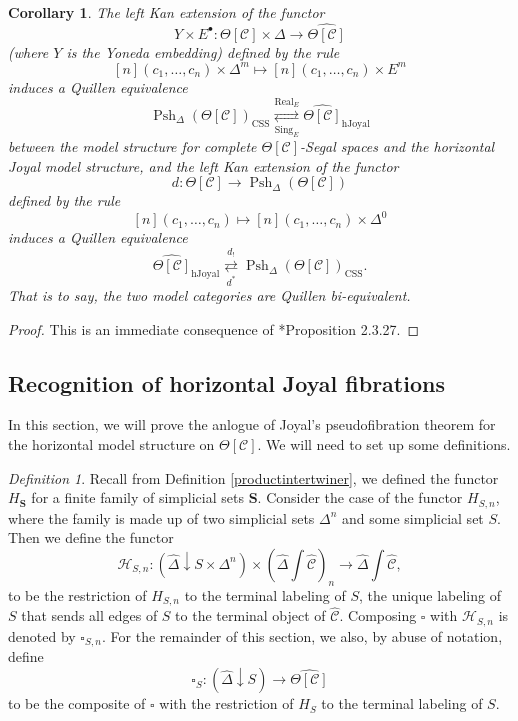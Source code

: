 \documentclass[leqno]{article}
\numberwithin{equation}{subsection}
\theoremstyle{plain}   %
\newtheorem{cor}[equation]{Corollary}
\theoremstyle{remark}
\newtheorem{defn}[equation]{Definition}
\theoremstyle{plain}
\DeclareMathOperator{\Psh}{Psh}
\newcommand{\overcat}[2]{{\left(#1\downarrow #2\right)}}
\newcommand{\psh}[1]{\ensuremath{\widehat{#1}}}
\renewcommand{\C}{\ensuremath{\mathcal{C}}}
\newcommand{\cellset}{\ensuremath{\widehat{\Theta[\mathcal{C}]}}}
\newcommand{\ssetlab}{\ensuremath{\widehat{\Delta} \int \widehat{\mathcal{C}}}}
\begin{document}
\begin{cor}
	The left Kan extension of the functor \[Y \times E^\bullet:\Theta[\C]\times \Delta \to \cellset\] (where \(Y\) is the Yoneda embedding) defined by the rule 
	\[[n](c_1,\dots,c_n)\times \Delta^m \mapsto [n](c_1,\dots,c_n) \times E^m\]
	induces a Quillen equivalence
	\[\Psh_\Delta(\Theta[\C])_{\mathrm{CSS}} \underset{\operatorname{Sing}_E}{\overset{\operatorname{Real}_E}{\rightleftarrows}} \cellset_{\mathrm{hJoyal}}\]
	between the model structure for complete \(\Theta[\C]\)-Segal spaces and the horizontal Joyal model structure,
	and the left Kan extension of the functor 
	\[d:\Theta[\C] \to \Psh_\Delta(\Theta[\C])\]
	defined by the rule
	\[[n](c_1,\dots,c_n) \mapsto [n](c_1,\dots,c_n) \times \Delta^0\]
	induces a Quillen equivalence
	\[\cellset_{\mathrm{hJoyal}} \underset{d^\ast}{\overset{d_!}{\rightleftarrows}} \Psh_\Delta(\Theta[\C])_{\mathrm{CSS}}.\]
	That is to say, the two model categories are Quillen bi-equivalent.
\end{cor}
\begin{proof} This is an immediate consequence of \cite{cisinski-book}*{Proposition 2.3.27}.
\end{proof}

\subsection{Recognition of horizontal Joyal fibrations}\label{admissible}
In this section, we will prove the anlogue of Joyal's pseudofibration theorem for the horizontal model structure on \(\Theta[\C]\).  We will need to set up some definitions.

\begin{defn}
	Recall from Definition \ref{productintertwiner}, we defined the functor \(H_\mathbf{S}\) for a finite family of simplicial sets \(\mathbf{S}\).  Consider the case of the functor \(H_{S,n}\), where the family is made up of two simplicial sets \(\Delta^n\) and some simplicial set \(S\).  Then we define the functor 
	\[\mathcal{H}_{S,n}: \overcat{\psh{\Delta}}{S\times \Delta^n} \times  \left(\ssetlab\right)_{n} \to \ssetlab,\]
	to be the restriction of \(H_{S,n}\) to the terminal labeling of \(S\), the unique labeling of \(S\) that sends all edges of \(S\) to the terminal object of \(\psh{\C}\).   Composing \(\square\) with \(\mathcal{H}_{S,n}\) is denoted by \(\square_{S,n}\).  For the remainder of this section, we also, by abuse of notation, define 
	\[\square_S:\overcat{\psh{\Delta}}{S} \to \cellset\]
	to be the composite of \(\square\) with the restriction of \(H_S\) to the terminal labeling of \(S\).  
\end{defn}
\end{document}
